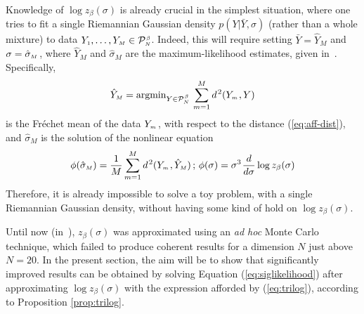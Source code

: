 \documentclass[draftclsnofoot]{IEEEtran}
\begin{document}
Knowledge of $\log z_\beta(\sigma)$ is already crucial in the simplest situation, where one tries to fit a single Riemannian Gaussian density $p(Y|\bar{Y},\sigma)$ (rather than a whole mixture) to data $Y_{\scriptscriptstyle 1},\ldots, Y_{\scriptscriptstyle M} \in \mathcal{P}^{\hspace{0.02cm}\scriptscriptstyle \beta}_{\scriptscriptstyle N}$. Indeed, this will require setting $\bar{Y} = \hat{Y}_{\scriptscriptstyle M}$ and $\sigma = \hat{\sigma}_{\scriptscriptstyle M}\hspace{0.03cm}$, where $\hat{Y}_{\scriptscriptstyle M}$ and $\hat{\sigma}_{\scriptscriptstyle M}$ are the maximum-likelihood estimates, given in~\cite{Sa16}\cite{Sa17}. Specifically,   
\begin{equation} \label{eq:frechet}
 \hat{Y}_{\scriptscriptstyle M} = \mathrm{argmin}_{Y \in \mathcal{P}^{\hspace{0.02cm}\scriptscriptstyle \beta}_{\scriptscriptstyle N}}\,\sum^M_{m=1} d^{\hspace{0.03cm} 2}(Y_{\scriptscriptstyle m}\hspace{0.03cm},Y)
\end{equation}
is the Fréchet mean of the data $Y_{\scriptscriptstyle m}\hspace{0.03cm}$, with respect to the distance (\ref{eq:aff-dist}), and $\hat{\sigma}_{\scriptscriptstyle M}$ is the solution of the nonlinear equation
\begin{equation} \label{eq:siglikelihood}
  \phi(\hat{\sigma}_{\scriptscriptstyle M}) =  \frac{1}{M}\sum^M_{m=1} d^{\hspace{0.03cm} 2}(Y_{\scriptscriptstyle m}\hspace{0.03cm},\hat{Y}_{\scriptscriptstyle M}) \,;\, \phi(\sigma) = \sigma^3\hspace{0.03cm}\frac{d}{d\sigma}\log z_\beta(\sigma)
\end{equation}
Therefore, it is already impossible to solve a toy problem, with a single Riemannian Gaussian density, without having some kind of hold on $\log z_\beta(\sigma)$.

Until now (in~\cite{Sa16}\cite{Sa17}), $z_\beta(\sigma)$ was approximated using an \textit{ad hoc} Monte Carlo technique, which failed to produce coherent results for a dimension $N$ just above $N = 20$. In the present section, the aim will be to show that significantly improved results can be obtained by solving Equation (\ref{eq:siglikelihood}) after approximating $\log z_\beta(\sigma)$ with the expression afforded by (\ref{eq:trilog}), according to Proposition \ref{prop:trilog}.
\end{document}
